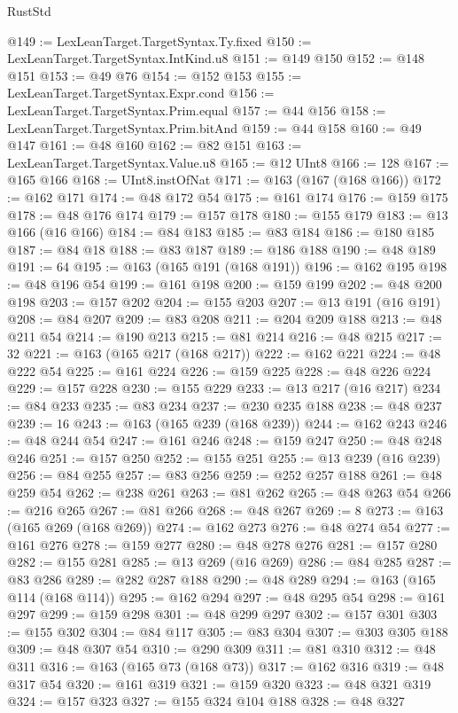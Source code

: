 \begin{lexlean}{RustStd}
\begin{coremodule}
@149 := LexLeanTarget.TargetSyntax.Ty.fixed
@150 := LexLeanTarget.TargetSyntax.IntKind.u8
@151 := @149 @150
@152 := @148 @151
@153 := @49 @76
@154 := @152 @153
@155 := LexLeanTarget.TargetSyntax.Expr.cond
@156 := LexLeanTarget.TargetSyntax.Prim.equal
@157 := @44 @156
@158 := LexLeanTarget.TargetSyntax.Prim.bitAnd
@159 := @44 @158
@160 := @49 @147
@161 := @48 @160
@162 := @82 @151
@163 := LexLeanTarget.TargetSyntax.Value.u8
@165 := @12 UInt8
@166 := 128
@167 := @165 @166
@168 := UInt8.instOfNat
@171 := @163 (@167 (@168 @166))
@172 := @162 @171
@174 := @48 @172 @54
@175 := @161 @174
@176 := @159 @175
@178 := @48 @176 @174
@179 := @157 @178
@180 := @155 @179
@183 := @13 @166 (@16 @166)
@184 := @84 @183
@185 := @83 @184
@186 := @180 @185
@187 := @84 @18
@188 := @83 @187
@189 := @186 @188
@190 := @48 @189
@191 := 64
@195 := @163 (@165 @191 (@168 @191))
@196 := @162 @195
@198 := @48 @196 @54
@199 := @161 @198
@200 := @159 @199
@202 := @48 @200 @198
@203 := @157 @202
@204 := @155 @203
@207 := @13 @191 (@16 @191)
@208 := @84 @207
@209 := @83 @208
@211 := @204 @209 @188
@213 := @48 @211 @54
@214 := @190 @213
@215 := @81 @214
@216 := @48 @215
@217 := 32
@221 := @163 (@165 @217 (@168 @217))
@222 := @162 @221
@224 := @48 @222 @54
@225 := @161 @224
@226 := @159 @225
@228 := @48 @226 @224
@229 := @157 @228
@230 := @155 @229
@233 := @13 @217 (@16 @217)
@234 := @84 @233
@235 := @83 @234
@237 := @230 @235 @188
@238 := @48 @237
@239 := 16
@243 := @163 (@165 @239 (@168 @239))
@244 := @162 @243
@246 := @48 @244 @54
@247 := @161 @246
@248 := @159 @247
@250 := @48 @248 @246
@251 := @157 @250
@252 := @155 @251
@255 := @13 @239 (@16 @239)
@256 := @84 @255
@257 := @83 @256
@259 := @252 @257 @188
@261 := @48 @259 @54
@262 := @238 @261
@263 := @81 @262
@265 := @48 @263 @54
@266 := @216 @265
@267 := @81 @266
@268 := @48 @267
@269 := 8
@273 := @163 (@165 @269 (@168 @269))
@274 := @162 @273
@276 := @48 @274 @54
@277 := @161 @276
@278 := @159 @277
@280 := @48 @278 @276
@281 := @157 @280
@282 := @155 @281
@285 := @13 @269 (@16 @269)
@286 := @84 @285
@287 := @83 @286
@289 := @282 @287 @188
@290 := @48 @289
@294 := @163 (@165 @114 (@168 @114))
@295 := @162 @294
@297 := @48 @295 @54
@298 := @161 @297
@299 := @159 @298
@301 := @48 @299 @297
@302 := @157 @301
@303 := @155 @302
@304 := @84 @117
@305 := @83 @304
@307 := @303 @305 @188
@309 := @48 @307 @54
@310 := @290 @309
@311 := @81 @310
@312 := @48 @311
@316 := @163 (@165 @73 (@168 @73))
@317 := @162 @316
@319 := @48 @317 @54
@320 := @161 @319
@321 := @159 @320
@323 := @48 @321 @319
@324 := @157 @323
@327 := @155 @324 @104 @188
@328 := @48 @327

\end{coremodule}
\end{lexlean}
